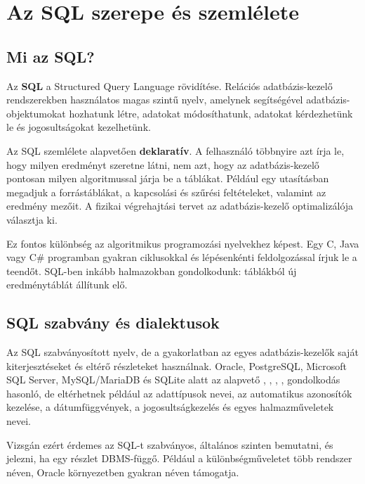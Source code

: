 \begin{center}

\end{center}

\section{Az SQL szerepe és szemlélete}

\subsection{Mi az SQL?}

Az \textbf{SQL} a Structured Query Language rövidítése. Relációs adatbázis-kezelő rendszerekben használatos magas szintű nyelv, amelynek segítségével adatbázis-objektumokat hozhatunk létre, adatokat módosíthatunk, adatokat kérdezhetünk le és jogosultságokat kezelhetünk.

Az SQL szemlélete alapvetően \textbf{deklaratív}. A felhasználó többnyire azt írja le, hogy milyen eredményt szeretne látni, nem azt, hogy az adatbázis-kezelő pontosan milyen algoritmussal járja be a táblákat. Például egy  utasításban megadjuk a forrástáblákat, a kapcsolási és szűrési feltételeket, valamint az eredmény mezőit. A fizikai végrehajtási tervet az adatbázis-kezelő optimalizálója választja ki.

Ez fontos különbség az algoritmikus programozási nyelvekhez képest. Egy C, Java vagy C\# programban gyakran ciklusokkal és lépésenkénti feldolgozással írjuk le a teendőt. SQL-ben inkább halmazokban gondolkodunk: táblákból új eredménytáblát állítunk elő.

\subsection{SQL szabvány és dialektusok}

Az SQL szabványosított nyelv, de a gyakorlatban az egyes adatbázis-kezelők saját kiterjesztéseket és eltérő részleteket használnak. Oracle, PostgreSQL, Microsoft SQL Server, MySQL/MariaDB és SQLite alatt az alapvető , , , ,  gondolkodás hasonló, de eltérhetnek például az adattípusok nevei, az automatikus azonosítók kezelése, a dátumfüggvények, a jogosultságkezelés és egyes halmazműveletek nevei.

Vizsgán ezért érdemes az SQL-t szabványos, általános szinten bemutatni, és jelezni, ha egy részlet DBMS-függő. Például a különbségműveletet több rendszer  néven, Oracle környezetben gyakran  néven támogatja.

